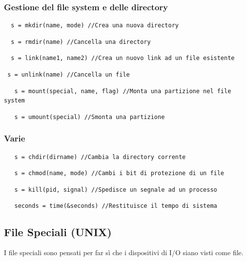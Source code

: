 \subsubsection{Gestione del file system e delle directory}
\begin{lstlisting}
  s = mkdir(name, mode) //Crea una nuova directory  
\end{lstlisting}

\begin{lstlisting}
  s = rmdir(name) //Cancella una directory 
\end{lstlisting}

\begin{lstlisting}
  s = link(name1, name2) //Crea un nuovo link ad un file esistente
\end{lstlisting}

\begin{lstlisting}
 s = unlink(name) //Cancella un file  
\end{lstlisting}

\begin{lstlisting}
   s = mount(special, name, flag) //Monta una partizione nel file system
\end{lstlisting}

\begin{lstlisting}
   s = umount(special) //Smonta una partizione
\end{lstlisting}

\subsubsection{Varie}

\begin{lstlisting}
   s = chdir(dirname) //Cambia la directory corrente
\end{lstlisting}

\begin{lstlisting}
   s = chmod(name, mode) //Cambi i bit di protezione di un file
\end{lstlisting}

\begin{lstlisting}
   s = kill(pid, signal) //Spedisce un segnale ad un processo
\end{lstlisting}

\begin{lstlisting}
   seconds = time(&seconds) //Restituisce il tempo di sistema
\end{lstlisting}
\newpage
\subsection{File Speciali (UNIX)}
I file speciali sono pensati per far sì che i dispositivi di I/O siano visti come file.
